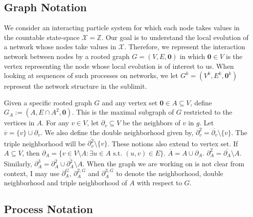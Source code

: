 \documentclass[12pt]{article}
\newcommand{\mb}{\mathbb}
\newcommand{\mc}{\mathcal}
\newcommand{\ov}{\overline}
\newcommand{\te}{\text}
\newcommand{\ind}{\hspace{24pt}}
\newcommand{\defeq}{:=}								%
\newcommand{\sta}{\mc{X}}							%
\newcommand{\neigh}[1]{\partial_{#1}}				%
\newcommand{\dneigh}[1]{\partial^2_{#1}}			%
\newcommand{\tneigh}[1]{\partial^3_{#1}}			%
\newcommand{\gneigh}[2]{\partial^{#1}_{#2}}			%
\newcommand{\dgneigh}[2]{\partial^{2,#1}_{#2}}		%
\newcommand{\tgneigh}[2]{\partial^{3,#1}_{#2}}		%
\newcommand{\cl}[1]{\ov{#1}}						%
\renewcommand{\root}{\mathbf{0}}
\newcommand{\indx}[1]{^{#1}}						%
\newcommand{\subg}[1]{_{#1}}						%
\begin{document}
\subsection{Graph Notation}
\label{g::not}

We consider an interacting particle system for which each node takes values in the countable state-space \(\sta = \mb{Z}\). Our goal is to understand the local evolution of a network whose nodes take values in \(\sta\). Therefore, we represent the interaction network between nodes by a rooted graph \(G = (V,E,\root)\) in which \(\root \in V\) is the vertex representing the node whose local evolution is of interest to us. When looking at sequences of such processes on networks, we let \(G\indx{k} = (V\indx{k},E\indx{k},\root\indx{k})\) represent the network structure in the sublimit.

\ind Given a specific rooted graph \(G\) and any vertex set \(\root \in A \subseteq V\), define \(G\subg{A} \defeq (A,E\cap A^2,\root)\). This is the maximal subgraph of \(G\) restricted to the vertices in \(A\). For any \(v \in V\), let \(\neigh{v}\subseteq V\) be the neighbors of \(v\) in \(g\). Let \(\cl{v} = \{v\}\cup\neigh{v}\). We also define the double neighborhood given by, \(\dneigh{v} = \cl{\neigh{v}}\setminus \{v\}\). The triple neighborhood will be \(\cl{\dneigh{v}} \setminus \{v\}\). These notions also extend to vertex set. If \(A\subseteq V\), then \(\neigh{A} = \{v \in V\setminus A: \exists u \in A\te{ s.t. } (u,v) \in E\}\). \(\cl{A} = A\cup \neigh{A}\). \(\dneigh{A} = \cl{\neigh{A}}\setminus A\). Similarly, \(\tneigh{A} = \dneigh{A} \cup \cl{\dneigh{A}}\setminus A\). When the graph we are working on is not clear from context, I may use \(\gneigh{G}{A}\), \(\dgneigh{G}{A}\) and \(\tgneigh{G}{A}\) to denote the neighborhood, double neighborhood and triple neighborhood of \(A\) with respect to \(G\).

\subsection{Process Notation}
\label{p::not}
\end{document}
